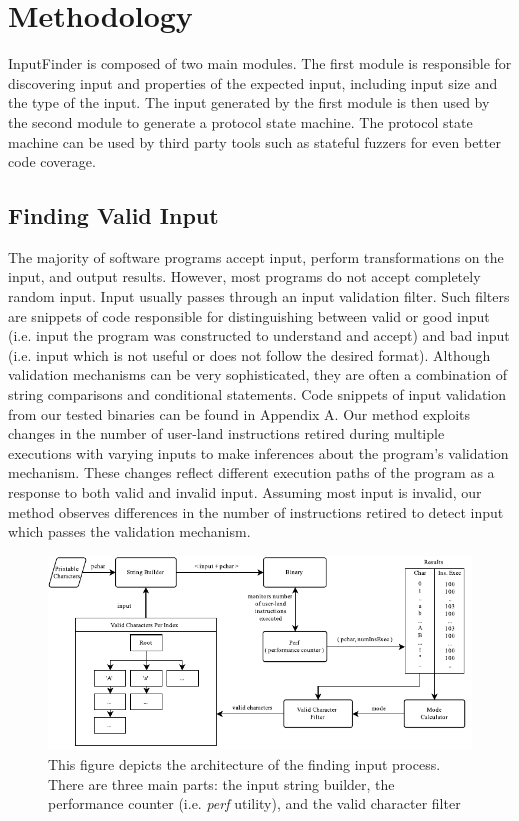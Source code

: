 \documentclass{acm_proc_article-sp}
\def \tool {InputFinder}
\begin{document}
\section{Methodology} \label{methodology}

\tool{} is composed of two main modules.
The first module is responsible for discovering input and properties of the expected input, including input size and the type of the input.
The input generated by the first module is then used by the second module to generate a protocol state machine.
The protocol state machine can be used by third party tools such as stateful fuzzers for even better code coverage.
\subsection{Finding Valid Input}
The majority of software programs accept input, perform transformations on the input, and output results.
However, most programs do not accept completely random input.
Input usually passes through an input validation filter.
Such filters are snippets of code responsible for distinguishing between valid or good input (i.e. input the program was constructed to understand and accept) and bad input (i.e. input which is not useful or does not follow the desired format).
Although validation mechanisms can be very sophisticated, they are often a combination of string comparisons and conditional statements.
Code snippets of input validation from our tested binaries can be found in Appendix A.
Our method exploits changes in the number of user-land instructions retired during multiple executions with varying inputs to make inferences about the program's validation mechanism.
These changes reflect different execution paths of the program as a response to both valid and invalid input.
Assuming most input is invalid, our method observes differences in the number of instructions retired to detect input which passes the validation mechanism.

\begin{figure}[t]
\centering
\includegraphics[width=\textwidth]{architecture.pdf}
\caption{This figure depicts the architecture of the finding input process. There are three main parts: the input string builder, the performance counter (i.e. \textit{perf} utility), and the valid character filter}
\label{fig:architecture}
\end{figure}
\end{document}
